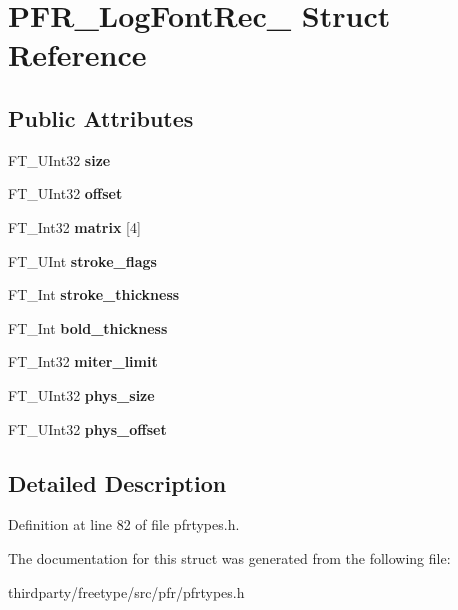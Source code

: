 \hypertarget{struct_p_f_r___log_font_rec__}{}\section{P\+F\+R\+\_\+\+Log\+Font\+Rec\+\_\+ Struct Reference}
\label{struct_p_f_r___log_font_rec__}
\subsection*{Public Attributes}
\begin{DoxyCompactItemize}
\item 
\mbox{\label{struct_p_f_r___log_font_rec___af1b75f2094ebb7b2331e97a2a304e83d}} 
F\+T\+\_\+\+U\+Int32 {\bfseries size}
\item 
\mbox{\label{struct_p_f_r___log_font_rec___a7bb67b08ec6c6acea4228f30c4c72fe7}} 
F\+T\+\_\+\+U\+Int32 {\bfseries offset}
\item 
\mbox{\label{struct_p_f_r___log_font_rec___a5f1639df2dd2532b641ead642e5aeeb0}} 
F\+T\+\_\+\+Int32 {\bfseries matrix} \mbox{[}4\mbox{]}
\item 
\mbox{\label{struct_p_f_r___log_font_rec___a9e4e391cf39aa28305a6a5ce84828a2c}} 
F\+T\+\_\+\+U\+Int {\bfseries stroke\+\_\+flags}
\item 
\mbox{\label{struct_p_f_r___log_font_rec___a89b41a55247d100da2c3bd101830515c}} 
F\+T\+\_\+\+Int {\bfseries stroke\+\_\+thickness}
\item 
\mbox{\label{struct_p_f_r___log_font_rec___afc155ccae1a3391e8ec45f85ed6b1e2c}} 
F\+T\+\_\+\+Int {\bfseries bold\+\_\+thickness}
\item 
\mbox{\label{struct_p_f_r___log_font_rec___aff18bf69b018cfabb869fd73c7560f01}} 
F\+T\+\_\+\+Int32 {\bfseries miter\+\_\+limit}
\item 
\mbox{\label{struct_p_f_r___log_font_rec___a82ba81da8b8fa9aaf82b8ca849ff9d4e}} 
F\+T\+\_\+\+U\+Int32 {\bfseries phys\+\_\+size}
\item 
\mbox{\label{struct_p_f_r___log_font_rec___a5ebf12096a8a125b9b41b74bb5e815b2}} 
F\+T\+\_\+\+U\+Int32 {\bfseries phys\+\_\+offset}
\end{DoxyCompactItemize}


\subsection{Detailed Description}


Definition at line 82 of file pfrtypes.\+h.



The documentation for this struct was generated from the following file\+:\begin{DoxyCompactItemize}
\item 
thirdparty/freetype/src/pfr/pfrtypes.\+h\end{DoxyCompactItemize}
